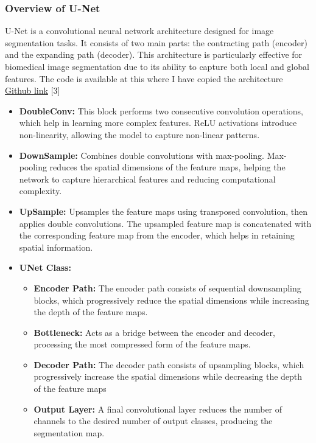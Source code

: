 \documentclass[11pt,a4paper]{article}
\begin{document}
\subsubsection{Overview of U-Net}
U-Net is a convolutional neural network architecture designed for image segmentation tasks. It consists of two main parts: the contracting path (encoder) and the expanding path (decoder).
\linebreak
This architecture is particularly effective for biomedical image segmentation due to its ability to capture both local and global features. The code is available at this where I have copied the architecture \href{https://github.com/uygarkurt/UNet-PyTorch/blob/main/unet.py}{Github link} [3]
\vspace{0.4cm}
\begin{itemize}
    \item \textbf{DoubleConv:} This block performs two consecutive convolution operations, which help in learning more complex features. ReLU activations introduce non-linearity, allowing the model to capture non-linear patterns.
    \item \textbf{DownSample:} Combines double convolutions with max-pooling. Max-pooling reduces the spatial dimensions of the feature maps, helping the network to capture hierarchical features and reducing computational complexity.
    \item \textbf{UpSample:} Upsamples the feature maps using transposed convolution, then applies double convolutions. The upsampled feature map is concatenated with the corresponding feature map from the encoder, which helps in retaining spatial information.
    \item \textbf{UNet Class:}
    \begin{itemize}
        \item \textbf{Encoder Path:} The encoder path consists of sequential downsampling blocks, which progressively reduce the spatial dimensions while increasing the depth of the feature maps.
        \item \textbf{Bottleneck:} Acts as a bridge between the encoder and decoder, processing the most compressed form of the feature maps.
        \item \textbf{Decoder Path:} The decoder path consists of upsampling blocks, which progressively increase the spatial dimensions while decreasing the depth of the feature maps
        \item \textbf{Output Layer:} A final convolutional layer reduces the number of channels to the desired number of output classes, producing the segmentation map.
    \end{itemize}
\end{itemize}
\end{document}
